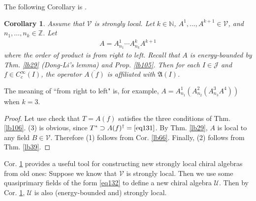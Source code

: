 \documentclass[12pt,b5paper,notitlepage]{article}
\theoremstyle{definition}
\theoremstyle{plain}
\newtheorem{co}[df]{Corollary}
\newcommand{\fk}{\mathfrak}
\newcommand{\mc}{\mathcal}
\newcommand{\ovl}{\overline}
\newcommand{\Nbb}{\mathbb N}
\newcommand{\Zbb}{\mathbb Z}
\newcommand{\MV}{\mathcal V}
\numberwithin{equation}{section}
\begin{document}
The following Corollary is \cite[Thm. 8.1]{CKLW18}.

\begin{co}\label{lb107}
Assume that $\MV$ is strongly local. Let $k\in\Nbb$, $A^1,\dots,A^{k+1}\in\MV$, and $n_1,\dots,n_k\in\Zbb$. Let
\begin{align}\label{eq132}
A=A^1_{n_1}\cdots A^k_{n_k}A^{k+1}
\end{align}
where the order of product is from right to left. Recall that $A$ is energy-bounded by Thm. \ref{lb29} (Dong-Li's lemma) and Prop. \ref{lb105}. Then for each $I\in\mc J$ and $f\in C_c^\infty(I)$, the operator $\ovl{A(f)}$ is affiliated with $\fk A(I)$.
\end{co}

The meaning of ``from right to left" is, for example, $A=A^1_{n_1}(A^2_{n_2}(A^3_{n_3}A^4))$ when $k=3$. 


\begin{proof}
Let use check that $T=A(f)$ satisfies the three conditions of Thm. \ref{lb106}. (3) is obvious, since $T^*\supset A(f)^\dagger=\eqref{eq131}$. By Thm. \ref{lb29}, $A$ is local to any field $B\in\MV$. Therefore (1) follows from Cor. \ref{lb66}. Finally, (2) follows from Thm. \ref{lb39}.
\end{proof}




Cor. \ref{lb107} provides a useful tool for constructing new strongly local chiral algebras from old ones: Suppose we know that $\MV$ is strongly local. Then we use some quasiprimary fields of the form \eqref{eq132} to define a new chiral algebra $\mc U$. Then by Cor. \ref{lb107}, $\mc U$ is also (energy-bounded and) strongly local.



































\hypertarget{beforeindex}{}	




\newpage
\end{document}
